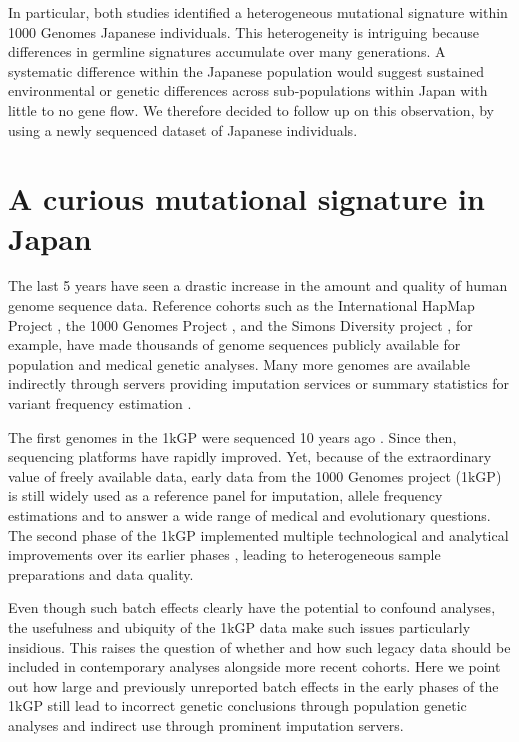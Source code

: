 \documentclass[
11pt, %
oneside, %
english, %
doublespacing, %
headsepline, %
]{MastersDoctoralThesis} %
\begin{document}
 In particular, both studies  identified a heterogeneous mutational signature within 1000 Genomes Japanese individuals.
This heterogeneity is intriguing because differences in germline signatures accumulate over many generations.
A systematic difference within the Japanese population would suggest sustained environmental or genetic differences across sub-populations within Japan with little to no gene flow.
We therefore decided to follow up on this observation, by using a newly sequenced dataset of Japanese individuals. 


\chapter{A curious mutational signature in Japan}
The last 5 years have seen a drastic increase in the amount and quality of human genome sequence data. 
Reference cohorts such as the International HapMap Project \citep{HapMap2005}, the 1000 Genomes Project \citep{1000GenomesProjectConsortium2010,The1000GenomesProjectConsortium2012}, and the Simons Diversity project \citep{Mallick2016}, for example, have made thousands of genome sequences publicly available for population and medical genetic analyses. 
Many more genomes are available indirectly through servers providing imputation services \citep{HapMap2005} or summary statistics for variant frequency estimation \citep{Lek2016}.

The first genomes in the 1kGP were sequenced 10 years ago \citep{VanDijk2014}. Since then, sequencing platforms have rapidly improved. 
Yet, because of the extraordinary value of freely available data, early data from the 1000 Genomes project (1kGP) is still widely used as a reference panel for imputation, allele frequency estimations and to answer a wide range of medical and evolutionary questions. 
The second phase of the 1kGP implemented multiple technological and analytical improvements over its earlier phases \citep{The1000GenomesProjectConsortium2012}, leading to heterogeneous sample preparations and data quality.

Even though such batch effects clearly have the potential to confound analyses, the usefulness and ubiquity of the 1kGP data make such issues particularly insidious.   
This raises the question of whether and how such legacy data should be included in contemporary analyses alongside more recent cohorts.
Here we point out how large and previously unreported batch effects in the early phases of the 1kGP still lead to incorrect genetic conclusions through population genetic analyses and indirect use through prominent imputation servers.
\end{document}
